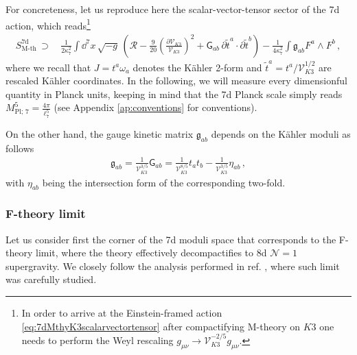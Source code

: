For concreteness, let us reproduce here the scalar-vector-tensor sector of the 7d action, which reads\footnote{\label{fnote:Weylrescaling7d}In order to arrive at the Einstein-framed action \eqref{eq:7dMthyK3scalarvectortensor} after compactifying M-theory on $K3$ one needs to perform the Weyl rescaling $g_{\mu \nu} \to \mathcal{V}_{K3}^{-2/5} g_{\mu \nu}$.}
%
\begin{equation}\label{eq:7dMthyK3scalarvectortensor}
	\begin{aligned}
		S_\text{M-th}^{\text{7d}}\, \supset\, & \frac{1}{2\kappa^2_7} \int \dd^{7}x\, \sqrt{-g}\,  \left( \mathcal{R} - \frac{9}{20} \left(\frac{\partial \mathcal{V}_{K3}}{\mathcal{V}_{K3}} \right)^2 + \mathsf{G}_{a b}\, \partial \tilde{t}^a \cdot \partial \tilde{t}^b\right) -\frac{1}{4\kappa_{7}^2} \int \mathfrak{g}_{a b}F^a \wedge F^b\, ,
	\end{aligned}
\end{equation}
%
where we recall that $J=t^a \omega_a$ denotes the K\"ahler 2-form and $\tilde{t}^a =t^a/\mathcal{V}_{K3}^{1/2}$ are rescaled K\"ahler coordinates. In the following, we will measure every dimensionful quantity in Planck units, keeping in mind that the 7d Planck scale simply reads $M_{\text{Pl};\, 7}^5= \frac{4 \pi}{\ell^5_{7}}$ (see Appendix \ref{ap:conventions} for conventions).

On the other hand, the gauge kinetic matrix $\mathfrak{g}_{a b}$ depends on the K\"ahler moduli as follows		
%
\begin{align}\label{eq:matrix1forms7dMtheory}
			\mathfrak{g}_{a b}= \frac{1}{\mathcal{V}_{K3}^{3/5}} \mathsf{G}_{a b}= \frac{1}{{\mathcal{V}_{K3}^{8/5}}}t_a t_b- \frac{1}{\mathcal{V}_{K3}^{3/5}}\eta_{a b}\, ,    
\end{align}
%
with $\eta_{a b}$ being the intersection form of the corresponding two-fold.

\subsubsection*{F-theory limit}
		
Let us consider first the corner of the 7d moduli space that corresponds to the F-theory limit, where the theory effectively decompactifies to 8d $\mathcal{N}=1$ supergravity. We closely follow the analysis performed in ref. \cite{Lee:2019xtm}, where such limit was carefully studied.

